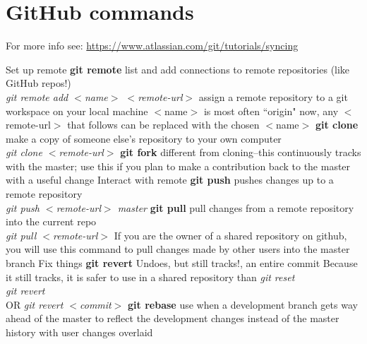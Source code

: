 \documentclass[12pt]{article}
\begin{document}
\section*{{\bf GitHub} commands}
             	For more info see: \href{url}{https://www.atlassian.com/git/tutorials/syncing}   
\begin{outline}[enumerate]
\1 Set up remote
	\2 {\bf git remote}
		\3 list and add connections to remote repositories (like GitHub repos!)
			\\ {\it git remote add  $<$name$>$ $<$remote-url$>$}
    				\4 assign a remote repository to  a git workspace on your local machine
				\4 $<$name$>$ is most often ``origin"
				\4 now, any $<$remote-url$>$ that follows can be replaced with the chosen $<$name$>$
	\2 {\bf git clone}
    		\3 make a copy of someone else's repository to your own computer
    			\\ {\it git clone $<$remote-url$>$}
	\2 {\bf git fork}
    		\3 different from cloning--this continuously tracks with the master;
    		\3 use this if you plan to make a contribution back to the master with a useful change
\1 Interact with remote
       	\2 {\bf git push}
    		\3 pushes changes up to a remote repository
    			\\ {\it git push $<$remote-url$>$ master}
	\2 {\bf git pull}
		\3 pull changes from a remote repository into the current repo
			\\ {\it git pull  $<$remote-url$>$}
		\3 If you are the owner of a shared repository on github, you will use this command to pull changes made by other users into the master branch
\1 Fix things
	\2 {\bf git revert}
		\3 Undoes, but still tracks!, an entire commit
		\3 Because it still tracks, it is safer to use in a shared repository than {\it git reset}
			\\ {\it git revert}
			\\ OR {\it git revert $<$commit$>$}
	\2 {\bf git rebase}
		\3 use when a development branch gets way ahead of the master to reflect the development changes instead of the master history with user changes overlaid
\end{outline}
\end{document}
